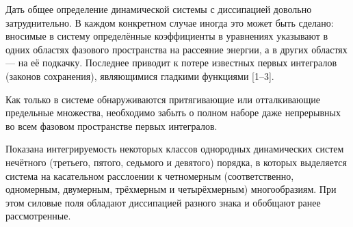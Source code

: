 
\vzmscaption





Дать общее определение динамической системы с диссипацией довольно
затруднительно. В каждом конкретном случае иногда это может быть
сделано: вносимые в систему определённые коэффициенты в уравнениях
указывают в одних областях фазового пространства на рассеяние
энергии, а в других областях --- на её подкачку. Последнее приводит
к потере известных первых интегралов (законов сохранения),
являющимися гладкими функциями [1--3].

Как только в системе обнаруживаются притягивающие или отталкивающие
предельные множества, необходимо забыть о полном наборе даже
непрерывных во всем фазовом пространстве первых интегралов.

Показана интегрируемость некоторых классов однородных динамических
систем нечётного (третьего, пятого, седьмого и девятого) порядка, в
которых выделяется система на касательном расслоении к четномерным
(соответственно, одномерным, двумерным, трёхмерным и четырёхмерным)
многообразиям. При этом силовые поля обладают диссипацией разного
знака и обобщают ранее рассмотренные.


